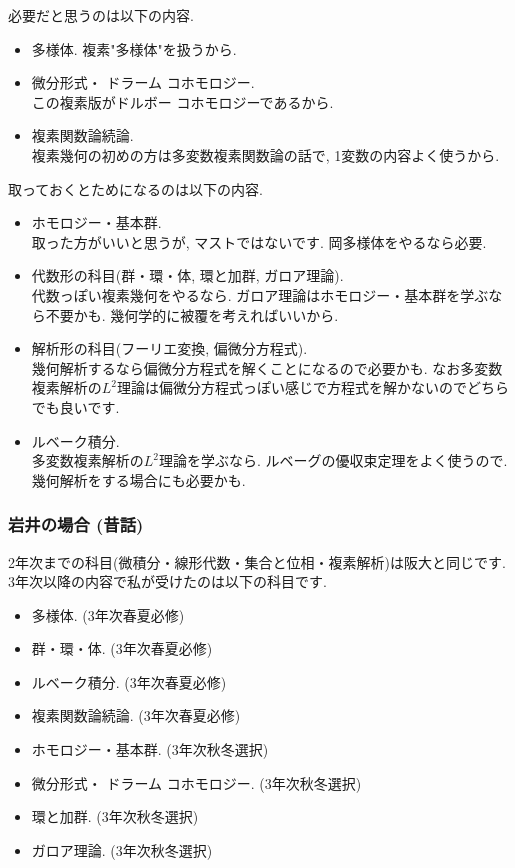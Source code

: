 必要だと思うのは以下の内容.
\vspace{-8pt}
\begin{itemize}[left=0pt]
  \setlength{\parskip}{0cm} %
  \setlength{\itemsep}{5pt} %
  \item 多様体. 複素"多様体"を扱うから. 
   \item 微分形式・ ドラーム コホモロジー. \\ この複素版がドルボー コホモロジーであるから.
  \item 複素関数論続論. \\ 複素幾何の初めの方は多変数複素関数論の話で, 1変数の内容よく使うから.
  \end{itemize}
取っておくとためになるのは以下の内容. 
\vspace{-8pt}
\begin{itemize}[left=0pt]
  \setlength{\parskip}{0cm} %
  \setlength{\itemsep}{5pt} %
  \item ホモロジー・基本群. 　\\ 取った方がいいと思うが, マストではないです. 岡多様体をやるなら必要. 
  \item 代数形の科目(群・環・体, 環と加群, ガロア理論). \\ 代数っぽい複素幾何をやるなら. ガロア理論はホモロジー・基本群を学ぶなら不要かも. 幾何学的に被覆を考えればいいから. %
 \item 解析形の科目(フーリエ変換, 偏微分方程式). \\  幾何解析するなら偏微分方程式を解くことになるので必要かも. なお多変数複素解析の$L^2$理論は偏微分方程式っぽい感じで方程式を解かないのでどちらでも良いです. 
  \item ルベーク積分.  \\ 多変数複素解析の$L^2$理論を学ぶなら. ルベーグの優収束定理をよく使うので. 幾何解析をする場合にも必要かも. 
    \end{itemize}


\subsubsection{岩井の場合 (昔話)}
2年次までの科目(微積分・線形代数・集合と位相・複素解析)は阪大と同じです. 
3年次以降の内容で私が受けたのは以下の科目です. 
\vspace{-8pt}
\begin{itemize}[left=0pt]
  \setlength{\parskip}{0cm} %
  \setlength{\itemsep}{0cm} 
 \item 多様体. (3年次春夏必修)
 \item 群・環・体. (3年次春夏必修)
 \item ルベーク積分. (3年次春夏必修)
 \item 複素関数論続論. (3年次春夏必修)
 \item ホモロジー・基本群. (3年次秋冬選択)
 \item 微分形式・ ドラーム コホモロジー. (3年次秋冬選択)
 \item 環と加群. (3年次秋冬選択)
 \item ガロア理論. (3年次秋冬選択)
  \end{itemize}
  
